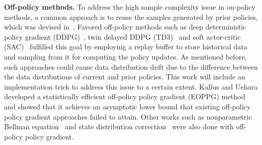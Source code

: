 \textbf{Off-policy methods.} To address the high sample complexity issue in on-policy methods, a common approach is to reuse the samples generated by prior policies, which was devised in~\cite{hester2018deep,mnih2013playing}. Favored off-policy methods such as deep deterministic policy gradient (DDPG)~\cite{lillicrap2015continuous}, twin delayed DDPG (TD3)~\cite{fujimoto2018addressing} and soft actor-critic (SAC)~\cite{haarnoja2018soft} fulfilled this goal by employing a replay buffer to store historical data and sampling from it for computing the policy updates. As mentioned before, such approaches could cause data distribution drift due to the difference between the data distributions of current and prior policies. This work will include an implementation trick to address this issue to a certain extent. Kallus and Uehara developed a statistically efficient off-policy policy gradient (EOPPG) method~\cite{kallus2020statistically} and showed that it achieves an asymptotic lower bound that existing off-policy policy gradient approaches failed to attain. Other works such as nonparametric Bellman equation~\cite{tosatto2020nonparametric} and state distribution correction~\cite{kallus2020statistically} were also done with off-policy policy gradient. 

